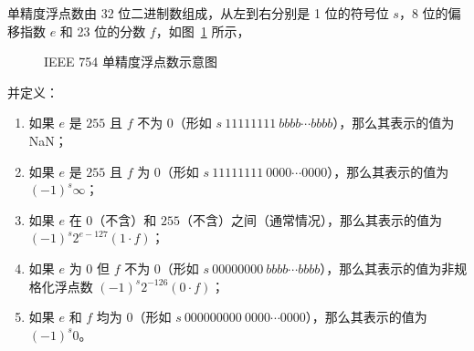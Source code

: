             单精度浮点数由 32 位二进制数组成，从左到右分别是 1 位的符号位 $s$，8 位的偏移指数 $e$ 和 23 位的分数 $f$，如图~\ref{fig:NumberSystemBasics/fixed-point-and-floating-point/ieee-754/basic-format/single} 所示，
            \begin{figure}
                \centering
                \caption{IEEE 754 单精度浮点数示意图}
                \label{fig:NumberSystemBasics/fixed-point-and-floating-point/ieee-754/basic-format/single}
            \end{figure}

            并定义：
            \begin{enumerate}
                \item 如果 $e$ 是 $255$ 且 $f$ 不为 $0$（形如 $s\ 11111111\ bbbb \cdots bbbb$），那么其表示的值为 NaN；
                \item 如果 $e$ 是 $255$ 且 $f$ 为 $0$（形如 $s\ 11111111\ 0000 \cdots 0000$），那么其表示的值为 $(-1)^s\infty$；
                \item 如果 $e$ 在 $0$（不含）和 $255$（不含）之间（通常情况），那么其表示的值为 $(-1)^s2^{e-127}(1 \cdot f)$；
                \item 如果 $e$ 为 $0$ 但 $f$ 不为 $0$（形如 $s\ 00000000\ bbbb \cdots bbbb$），那么其表示的值为非规格化浮点数 $(-1)^s2^{-126}(0 \cdot f)$；
                \item 如果 $e$ 和 $f$ 均为 $0$（形如 $s\ 000000000\ 0000 \cdots 0000$），那么其表示的值为 $(-1)^s0$。
            \end{enumerate}
